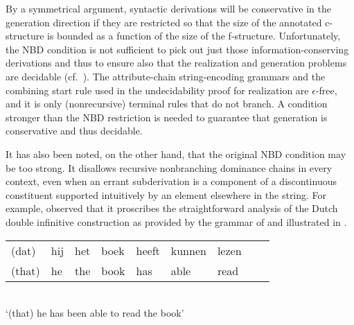 \documentclass[output=paper,hidelinks]{langscibook}
\begin{document}
By a symmetrical argument, syntactic derivations will be conservative in the generation direction if they are restricted so that the size of the annotated c-structure is bounded as a function of the size of the f-structure.  Unfortunately, the NBD condition is not sufficient to pick out just those information-conserving derivations and thus to ensure also that the realization and generation problems are decidable (cf.\ \citet{Wedekind2014, wed:kap:20}). The attribute-chain string-encoding grammars and the combining start rule  used in the undecidability proof for realization are $\epsilon$-free, and it is only (nonrecursive) terminal rules that do not branch.  A condition stronger than the NBD restriction is needed to guarantee that generation is conservative and thus decidable.

It has also been noted, on the other hand, that the original NBD condition may be too strong.  It disallows recursive nonbranching dominance chains in every context, even when an errant subderivation is a component of a discontinuous constituent supported intuitively by an element elsewhere in the string. For example, \citet{Johnson1986} observed that it proscribes the straightforward analysis of the Dutch double infinitive construction as provided by the grammar of \citet{BKPZ:Dutch} and illustrated in . 

\ea\label{dutchex}
      \begin{tabular}[t]{@{}lllllllll}
                 (dat) & hij & het &  boek & heeft & kunnen & lezen\\
                  (that)&  he& the &book& has &able& read
       \end{tabular}\\
                  `(that) he has been able to read the book'
\z
\end{document}
